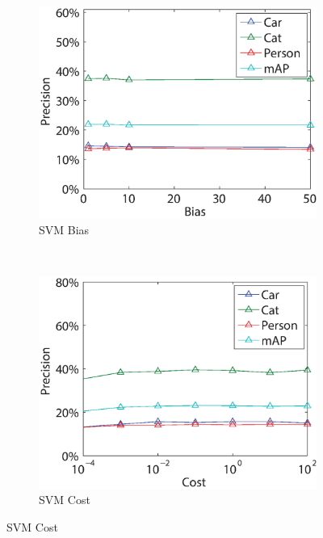\documentclass[10pt,twocolumn,letterpaper]{article}
\begin{document}
\begin{figure}
	\vspace{-5mm}
        \centering
        \begin{subfigure}[b]{0.24\textwidth}
                \includegraphics[width=\textwidth]{figures/tuning/bias.eps}
                \caption{SVM Bias}
                \label{fig:bias}
        \end{subfigure}%
        ~ 
        \begin{subfigure}[b]{0.24\textwidth}
                \includegraphics[width=\textwidth]{figures/tuning/cost.eps}
                \caption{SVM Cost}
                \label{fig:cost}
        \end{subfigure}

\end{figure}
\end{document}
